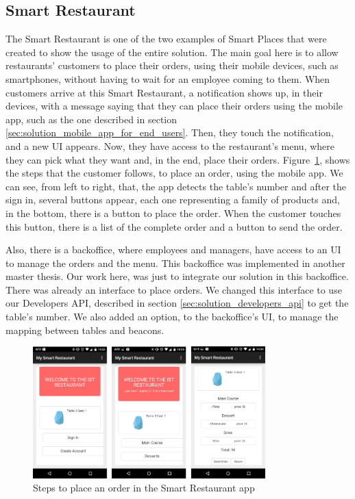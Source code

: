 \subsection{Smart Restaurant}
\label{sub:solution_smart_restaurant}
The Smart Restaurant is one of the two examples of Smart Places that were created to show the usage of the entire solution.
The main goal here is to allow restaurants' customers to place their orders, using their mobile devices, such as smartphones, without having to wait for an employee coming to them.
When customers arrive at this Smart Restaurant, a notification shows up, in their devices, with a message saying that they can place their orders using the mobile app, such as the one described in section \ref{sec:solution_mobile_app_for_end_users}.
Then, they touch the notification, and a new \gls{UI} appears.
Now, they have access to the restaurant's menu, where they can pick what they want and, in the end, place their orders.
Figure~\ref{fig:smart_restaurant_app}, shows the steps that the customer follows, to place an order, using the mobile app. We can see, from left to right, that, the app detects the table's number and after the sign in, several buttons appear, each one representing a family of products and, in the bottom, there is a button to place the order.
When the customer touches this button, there is a list of the complete order and a button to send the order.

Also, there is a backoffice, where employees and managers, have access to an \gls{UI} to manage the orders and the menu.
This backoffice was implemented in another master thesis\cite{SLOC}.
Our work here, was just to integrate our solution in this backoffice.
There was already an interface to place orders.
We changed this interface to use our Developers \gls{API}, described in section \ref{sec:solution_developers_api} to get the table's number.
We also added an option, to the backoffice's \gls{UI}, to manage the mapping between tables and beacons.

\begin{figure}[!ht]
  \centering
    \includegraphics[width=0.8\textwidth, keepaspectratio]{images/screenshots/smart_restaurant_app}
    \caption[Smart Restaurant]{Steps to place an order in the Smart Restaurant app}
    \label{fig:smart_restaurant_app}
\end{figure}

